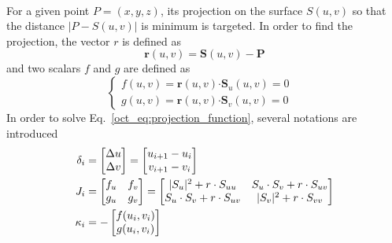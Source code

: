 \paragraph{}
For a given point $P=(x,y,z)$, its projection on the surface $S(u, v)$ so that the distance $|P-S(u,v)|$ is minimum is targeted.
In order to find the projection, the vector $r$ is defined as
\begin{equation}
    \mathbf{r} (u, v) =
    \mathbf{S} (u, v) -
    \mathbf{P}
\end{equation}
%
and two scalars $f$ and $g$ are defined as
\begin{equation}
    \left\{
        \begin{array}{rl}
            f (u, v) =
            \mathbf{r}(u, v) \mathbf{\cdot} \mathbf{S}_u (u, v)
            = 0 & \\
            g (u, v) =
            \mathbf{r}(u, v) \mathbf{\cdot} \mathbf{S}_v (u, v)
            = 0 &
        \end{array}
    \right.
\label{oct_eq:projection_function}
\end{equation}
%
In order to solve Eq.~\ref{oct_eq:projection_function}, several notations are introduced
\begin{align*}
    \delta_i &=
        \begin{bmatrix}
            \Delta u \\
            \Delta v
        \end{bmatrix} = 
        \begin{bmatrix}
            u_{i+1} - u_i \\
            v_{i+1} - v_i
        \end{bmatrix} \\
    J_i &=
        \begin{bmatrix}
            f_u & f_v \\
            g_u & g_v
        \end{bmatrix} = 
        \begin{bmatrix}
            \boldmath
            |S_u|^2 + r \cdot S_{uu}        &       S_u \cdot S_v + r \cdot S_{uv} \\
            S_u \cdot S_v + r \cdot S_{uv}  &       |S_v|^2 + r \cdot S_{vv}
        \end{bmatrix} \\
    \kappa_i & = -
        \begin{bmatrix}
            f(u_i, v_i) \\
            g(u_i, v_i)
        \end{bmatrix}
\end{align*}
